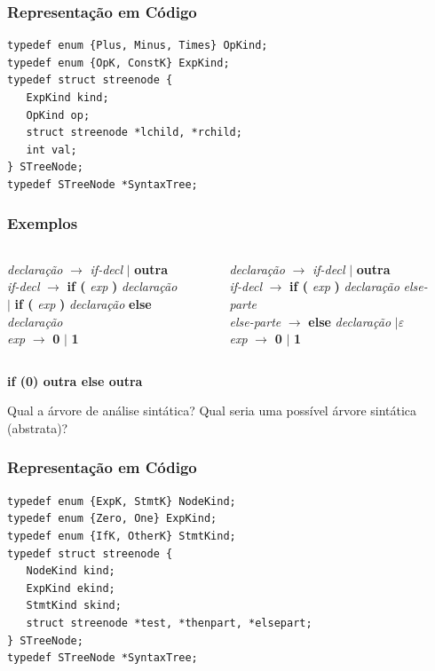 \documentclass[table]{beamer}
\begin{document}
\begin{frame}[fragile]
   \frametitle{Representação em Código}
   \begin{verbatim}
typedef enum {Plus, Minus, Times} OpKind;
typedef enum {OpK, ConstK} ExpKind;
typedef struct streenode {
   ExpKind kind;
   OpKind op;
   struct streenode *lchild, *rchild;
   int val;
} STreeNode;
typedef STreeNode *SyntaxTree;
   \end{verbatim}
\end{frame}

\begin{frame}
   \frametitle{Exemplos}
   \begin{columns}
   \begin{column}{0.5\textwidth}
      \textit{declaração} $\to$ \textit{if-decl} $|$ \textbf{outra} \\
      \textit{if-decl} $\to$ \textbf{if (} \textit{exp} \textbf{)} \textit{declaração} \\
      \hspace{1.3cm} $|$ \textbf{if (} \textit{exp} \textbf{)} \textit{declaração} \textbf{else} \textit{declaração} \\
      \textit{exp} $\to$ \textbf{0} $|$ \textbf{1}
   \end{column}
   \begin{column}{0.5\textwidth}
      \textit{declaração} $\to$ \textit{if-decl} $|$ \textbf{outra} \\
      \textit{if-decl} $\to$ \textbf{if (} \textit{exp} \textbf{)} \textit{declaração} \textit{else-parte} \\ 
      \textit{else-parte} $\to$ \textbf{else} \textit{declaração} $| \varepsilon$ \\
      \textit{exp} $\to$ \textbf{0} $|$ \textbf{1}
   \end{column}
   \end{columns}
   \begin{center}
   \textbf{if (0) outra else outra}
   \end{center}
   Qual a árvore de análise sintática? Qual seria uma possível árvore sintática (abstrata)?
\end{frame}

\begin{frame}[fragile]
   \frametitle{Representação em Código}
   \begin{verbatim}
typedef enum {ExpK, StmtK} NodeKind;
typedef enum {Zero, One} ExpKind;
typedef enum {IfK, OtherK} StmtKind;
typedef struct streenode {
   NodeKind kind;
   ExpKind ekind;
   StmtKind skind;
   struct streenode *test, *thenpart, *elsepart;
} STreeNode;
typedef STreeNode *SyntaxTree;
   \end{verbatim}
\end{frame}
\end{document}
